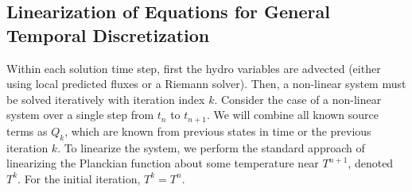 \documentclass[preprint,12pt]{elsarticle}
\begin{document}
\subsection{Linearization of Equations for General Temporal Discretization}
\label{sec:linearization}
Within each solution time step, first the hydro variables are advected (either
using local predicted fluxes or a Riemann solver).  Then, a non-linear system
must be solved iteratively with iteration index $k$.  Consider the case of a non-linear system over a single step from
$t_n$ to $t_{n+1}$. We will combine all known source terms as $Q_k$, which are known from previous states in time or
the previous iteration $k$.  To linearize the system, we perform the standard
approach of linearizing the Planckian function about some temperature near
$T^{n+1}$, denoted $T^k$. For the initial iteration, $T^k=T^n$.  
\end{document}
